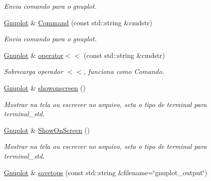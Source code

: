 \begin{DoxyCompactItemize}
\begin{DoxyCompactList}\small\item\em Envia comando para o gnuplot. \end{DoxyCompactList}\item 
\hypertarget{classGnuplot_a0d6db1521e789d7b73415ce85b723046}{\hyperlink{classGnuplot}{Gnuplot} \& \hyperlink{classGnuplot_a0d6db1521e789d7b73415ce85b723046}{Command} (const std\-::string \&cmdstr)}\label{classGnuplot_a0d6db1521e789d7b73415ce85b723046}

\begin{DoxyCompactList}\small\item\em Envia comando para o gnuplot. \end{DoxyCompactList}\item 
\hypertarget{classGnuplot_ae56495dc15f23d32f099129d3a50dd6c}{\hyperlink{classGnuplot}{Gnuplot} \& \hyperlink{classGnuplot_ae56495dc15f23d32f099129d3a50dd6c}{operator$<$$<$} (const std\-::string \&cmdstr)}\label{classGnuplot_ae56495dc15f23d32f099129d3a50dd6c}

\begin{DoxyCompactList}\small\item\em Sobrecarga operador $<$$<$, funciona como Comando. \end{DoxyCompactList}\item 
\hypertarget{classGnuplot_a356d2faaa79f08d13fec9718b776b28d}{\hyperlink{classGnuplot}{Gnuplot} \& \hyperlink{classGnuplot_a356d2faaa79f08d13fec9718b776b28d}{showonscreen} ()}\label{classGnuplot_a356d2faaa79f08d13fec9718b776b28d}

\begin{DoxyCompactList}\small\item\em Mostrar na tela ou escrever no arquivo, seta o tipo de terminal para terminal\-\_\-std. \end{DoxyCompactList}\item 
\hypertarget{classGnuplot_aee70cb6dfc893d6f19976fa9042c8e7c}{\hyperlink{classGnuplot}{Gnuplot} \& \hyperlink{classGnuplot_aee70cb6dfc893d6f19976fa9042c8e7c}{Show\-On\-Screen} ()}\label{classGnuplot_aee70cb6dfc893d6f19976fa9042c8e7c}

\begin{DoxyCompactList}\small\item\em Mostrar na tela ou escrever no arquivo, seta o tipo de terminal para terminal\-\_\-std. \end{DoxyCompactList}\item 
\hypertarget{classGnuplot_a032072c7c01b508a7535a17fb08562b1}{\hyperlink{classGnuplot}{Gnuplot} \& \hyperlink{classGnuplot_a032072c7c01b508a7535a17fb08562b1}{savetops} (const std\-::string \&filename=\char`\"{}gnuplot\-\_\-output\char`\"{})}\label{classGnuplot_a032072c7c01b508a7535a17fb08562b1}


\end{DoxyCompactItemize}
